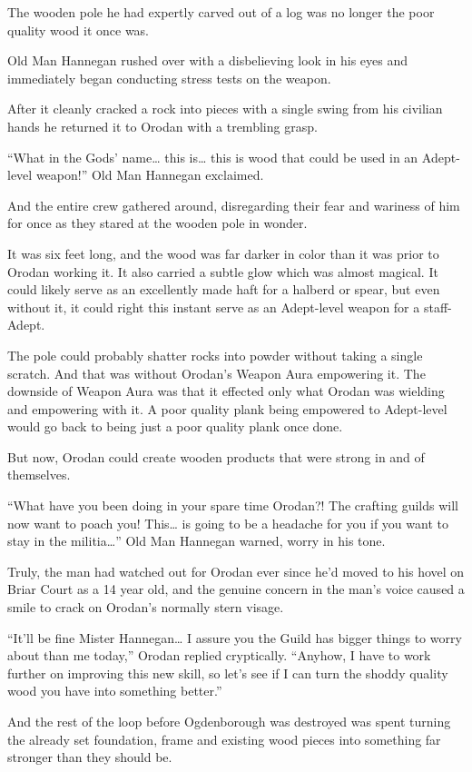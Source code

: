 \documentclass[a4paper,10pt]{book}
\begin{document}
The wooden pole he had expertly carved out of a log was no longer the poor quality wood it once was.\par
Old Man Hannegan rushed over with a disbelieving look in his eyes and immediately began conducting stress tests on the weapon.\par
After it cleanly cracked a rock into pieces with a single swing from his civilian hands he returned it to Orodan with a trembling grasp.\par
“What in the Gods’ name… this is… this is wood that could be used in an Adept-level weapon!” Old Man Hannegan exclaimed.\par
And the entire crew gathered around, disregarding their fear and wariness of him for once as they stared at the wooden pole in wonder.\par
It was six feet long, and the wood was far darker in color than it was prior to Orodan working it. It also carried a subtle glow which was almost magical. It could likely serve as an excellently made haft for a halberd or spear, but even without it, it could right this instant serve as an Adept-level weapon for a staff-Adept.\par
The pole could probably shatter rocks into powder without taking a single scratch. And that was without Orodan’s Weapon Aura empowering it. The downside of Weapon Aura was that it effected only what Orodan was wielding and empowering with it. A poor quality plank being empowered to Adept-level would go back to being just a poor quality plank once done.\par
But now, Orodan could create wooden products that were strong in and of themselves.\par
“What have you been doing in your spare time Orodan?! The crafting guilds will now want to poach you! This… is going to be a headache for you if you want to stay in the militia…” Old Man Hannegan warned, worry in his tone.\par
Truly, the man had watched out for Orodan ever since he’d moved to his hovel on Briar Court as a 14 year old, and the genuine concern in the man’s voice caused a smile to crack on Orodan’s normally stern visage.\par
“It’ll be fine Mister Hannegan… I assure you the Guild has bigger things to worry about than me today,” Orodan replied cryptically. “Anyhow, I have to work further on improving this new skill, so let’s see if I can turn the shoddy quality wood you have into something better.”\par
And the rest of the loop before Ogdenborough was destroyed was spent turning the already set foundation, frame and existing wood pieces into something far stronger than they should be.\par
\end{document}
